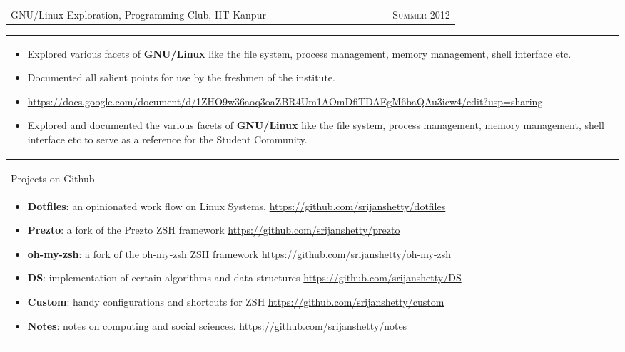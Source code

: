 \documentclass[a4paper,10pt]{article} %
\newcommand{\iproject}[3]{
    \begin{tabular}{p{0.85\linewidth}r}
        \textcolor{NavyBlue}{#2} & \multicolumn{1}{m{3cm}}{\raggedleft \textsc{#1}}\\
    \end{tabular}
    \begin{tabular}{p{\linewidth}}
    \vspace{-0.3cm}
        \footnotesize{#3}
    \end{tabular}
    \vspace{-0.5cm}
}
\newcommand{\projectlist}[2]{
    \begin{tabular}{p{\linewidth}}
        \textcolor{NavyBlue}{#1}\\
        \vspace{-0.3cm}
        \footnotesize{#2}
    \end{tabular}
    \vspace{-0.4cm}
}
\begin{document}
\iproject {Summer 2012}
          {GNU/Linux Exploration, Programming Club, IIT Kanpur}
          {
              \begin{itemize}[leftmargin=0.5cm]
                  \item Explored various facets of \textbf{GNU/Linux} like the file system, process management, memory management,
                      shell interface etc.
                  \item Documented all salient points for use by the freshmen of the institute.
                  \item \href{https://docs.google.com/document/d/1ZHO9w36aoq3oaZBR4Um1AOmDfiTDAEgM6baQAu3icw4/edit?usp=sharing}{https://docs.google.com/document/d/1ZHO9w36aoq3oaZBR4Um1AOmDfiTDAEgM6baQAu3icw4/edit?usp=sharing}
                  \item Explored and documented the various facets of \textbf{GNU/Linux} like the file system, process management, memory management,
                      shell interface etc to serve as a reference for the Student Community.
              \end{itemize}
          }

\projectlist {Projects on Github}
             {
                 \begin{itemize}[leftmargin=0.5cm]
                     \item \textbf{Dotfiles}: an opinionated work flow on Linux Systems.
                         \href{https://github.com/srijanshetty/dotfiles} {https://github.com/srijanshetty/dotfiles}
                     \item \textbf{Prezto}: a fork of the Prezto ZSH framework
                         \href{https://github.com/srijanshetty/prezto} {https://github.com/srijanshetty/prezto}
                     \item \textbf{oh-my-zsh}: a fork of the oh-my-zsh ZSH framework
                         \href{https://github.com/srijanshetty/oh-my-zsh} {https://github.com/srijanshetty/oh-my-zsh}
                     \item \textbf{DS}: implementation of certain algorithms and data structures
                         \href{https://github.com/srijanshetty/DS} {https://github.com/srijanshetty/DS}
                     \item \textbf{Custom}: handy configurations and shortcuts for ZSH
                         \href{https://github.com/srijanshetty/custom} {https://github.com/srijanshetty/custom}
                     \item \textbf{Notes}: notes on computing and social sciences.
                         \href{https://github.com/srijanshetty/notes} {https://github.com/srijanshetty/notes}
                 \end{itemize}
             }
\end{document}
